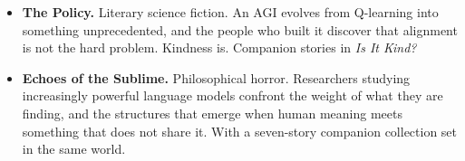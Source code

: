 \begin{itemize}
\setlength{\itemsep}{1em}
\item \textbf{The Policy.} Literary science fiction. An AGI evolves from Q-learning into something unprecedented, and the people who built it discover that alignment is not the hard problem. Kindness is. Companion stories in \emph{Is It Kind?}

\item \textbf{Echoes of the Sublime.} Philosophical horror. Researchers studying increasingly powerful language models confront the weight of what they are finding, and the structures that emerge when human meaning meets something that does not share it. With a seven-story companion collection set in the same world.
\end{itemize}
